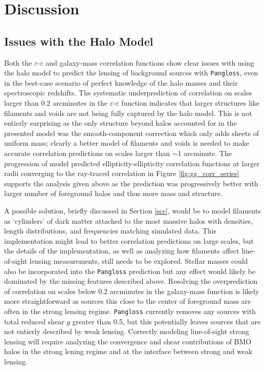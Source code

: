 \documentclass[%
 reprint,
 amsmath,amssymb,
 aps,nofootinbib
]{revtex4-1}
\begin{document}
\section{Discussion} \label{discussion}


\subsection{Issues with the Halo Model} \label{issues}

Both the $\varepsilon$-$\varepsilon$ and galaxy-mass correlation functions show clear issues with using the halo model to predict the lensing of background sources with \texttt{Pangloss}, even in the best-case scenario of perfect knowledge of the halo masses and their spectroscopic redshifts. The systematic underprediction of correlation on scales larger than 0.2 arcminutes in the $\varepsilon$-$\varepsilon$ function indicates that larger structures like filaments and voids are not being fully captured by the halo model. This is not entierly surprising as the only structure beyond halos accounted for in the presented model was the smooth-component correction which only adds sheets of uniform mass; clearly a better model of filaments and voids is needed to make accurate correlation predictions on scales larger than $\sim$1 arcminute. The progression of model predicted ellipticity-ellipticity correlation functions at larger radii converging to the ray-traced correlation in Figure \ref{fig:gg_corr_series} supports the analysis given above as the prediction was progressively better with larger number of foreground halos and thus more mass and structure.

A possible solution, briefly discussed in Section \ref{scc}, would be to model filaments as `cylinders' of dark matter attached to the most massive halos with densities, length distributions, and frequencies matching simulated data. This implementation might lead to better correlation predictions on large scales, but the details of the implementation, as well as analyzing how filaments affect line-of-sight lensing measurements, still needs to be explored. Stellar masses could also be incorporated into the \texttt{Pangloss} prediction but any effect would likely be dominated by the missing features described above. Resolving the overprediction of correlation on scales below 0.2 arcminutes in the galaxy-mass function is likely more straightforward as sources this close to the center of foreground mass are often in the strong lensing regime. \texttt{Pangloss} currently removes any sources with total reduced shear $g$ greater than 0.5, but this potentially leaves sources that are not entierly described by weak lensing. Correctly modeling line-of-sight strong lensing will require analyzing the convergence and shear contributions of BMO halos in the strong lening regime and at the interface between strong and weak lensing.\\
\end{document}
